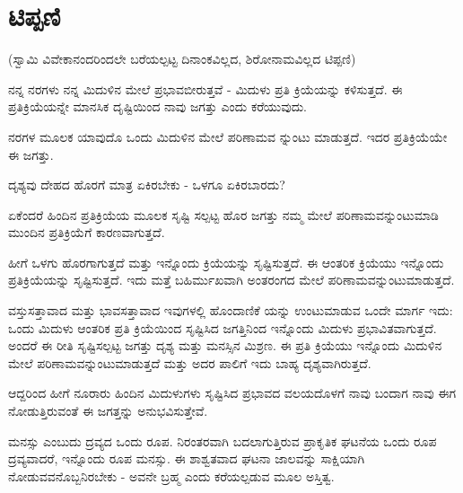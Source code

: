 
\chapter{ಟಿಪ್ಪಣಿ}

(ಸ್ವಾಮಿ ವಿವೇಕಾನಂದರಿಂದಲೇ ಬರೆಯಲ್ಪಟ್ಟ ದಿನಾಂಕವಿಲ್ಲದ, ಶಿರೋನಾಮವಿಲ್ಲದ ಟಿಪ್ಪಣಿ)

ನನ್ನ ನರಗಳು ನನ್ನ ಮಿದುಳಿನ ಮೇಲೆ ಪ್ರಭಾವಬೀರುತ್ತವೆ - ಮಿದುಳು ಪ್ರತಿ ಕ್ರಿಯೆಯನ್ನು ಕಳಿಸುತ್ತದೆ. ಈ ಪ್ರತಿಕ್ರಿಯೆಯನ್ನೇ ಮಾನಸಿಕ ದೃಷ್ಟಿಯಿಂದ ನಾವು ಜಗತ್ತು ಎಂದು ಕರೆಯುವುದು.

ನರಗಳ ಮೂಲಕ ಯಾವುದೊ ಒಂದು ಮಿದುಳಿನ ಮೇಲೆ ಪರಿಣಾಮವ ನ್ನುಂಟು ಮಾಡುತ್ತದೆ. ಇದರ ಪ್ರತಿಕ್ರಿಯೆಯೇ ಈ ಜಗತ್ತು.

ದೃಶ್ಯವು ದೇಹದ ಹೊರಗೆ ಮಾತ್ರ ಏಕಿರಬೇಕು - ಒಳಗೂ ಏಕಿರಬಾರದು?

ಏಕೆಂದರೆ ಹಿಂದಿನ ಪ್ರತಿಕ್ರಿಯೆಯ ಮೂಲಕ ಸೃಷ್ಟಿ ಸಲ್ಪಟ್ಟ ಹೊರ ಜಗತ್ತು ನಮ್ಮ ಮೇಲೆ ಪರಿಣಾಮವನ್ನುಂಟುಮಾಡಿ ಮುಂದಿನ ಪ್ರತಿಕ್ರಿಯೆಗೆ ಕಾರಣವಾಗುತ್ತದೆ.

ಹೀಗೆ ಒಳಗು ಹೊರಗಾಗುತ್ತದೆ ಮತ್ತು ಇನ್ನೊಂದು ಕ್ರಿಯೆಯನ್ನು ಸೃಷ್ಟಿಸುತ್ತದೆ. ಈ ಆಂತರಿಕ ಕ್ರಿಯೆಯು ಇನ್ನೊಂದು ಪ್ರತಿಕ್ರಿಯೆಯನ್ನು ಸೃಷ್ಟಿಸುತ್ತದೆ. ಇದು ಮತ್ತೆ ಬಹಿರ್ಮುಖವಾಗಿ ಅಂತರಂಗದ ಮೇಲೆ ಪರಿಣಾಮವನ್ನುಂಟುಮಾಡುತ್ತದೆ.

ವಸ್ತುಸತ್ತಾವಾದ ಮತ್ತು ಭಾವಸತ್ತಾವಾದ ಇವುಗಳಲ್ಲಿ ಹೊಂದಾಣಿಕೆ ಯನ್ನು ಉಂಟುಮಾಡುವ ಒಂದೇ ಮಾರ್ಗ ಇದು: ಒಂದು ಮಿದುಳು ಆಂತರಿಕ ಪ್ರತಿ ಕ್ರಿಯೆಯಿಂದ ಸೃಷ್ಟಿಸಿದ ಜಗತ್ತಿನಿಂದ ಇನ್ನೊಂದು ಮಿದುಳು ಪ್ರಭಾವಿತವಾಗುತ್ತದೆ. ಅಂದರೆ ಈ ರೀತಿ ಸೃಷ್ಟಿಸಲ್ಪಟ್ಟ ಜಗತ್ತು ದೃಶ್ಯ ಮತ್ತು ಮನಸ್ಸಿನ ಮಿಶ್ರಣ. ಈ ಪ್ರತಿ ಕ್ರಿಯೆಯು ಇನ್ನೊಂದು ಮಿದುಳಿನ ಮೇಲೆ ಪರಿಣಾಮವನ್ನುಂಟುಮಾಡುತ್ತದೆ ಮತ್ತು ಅದರ ಪಾಲಿಗೆ ಇದು ಬಾಹ್ಯ ದೃಶ್ಯವಾಗಿರುತ್ತದೆ.

ಆದ್ದರಿಂದ ಹೀಗೆ ನೂರಾರು ಹಿಂದಿನ ಮಿದುಳುಗಳು ಸೃಷ್ಟಿಸಿದ ಪ್ರಭಾವದ ವಲಯದೊಳಗೆ ನಾವು ಬಂದಾಗ ನಾವು ಈಗ ನೋಡುತ್ತಿರುವಂತೆ ಈ ಜಗತ್ತನ್ನು ಅನುಭವಿಸುತ್ತೇವೆ.

ಮನಸ್ಸು ಎಂಬುದು ದ್ರವ್ಯದ ಒಂದು ರೂಪ. ನಿರಂತರವಾಗಿ ಬದಲಾಗುತ್ತಿರುವ ಪ್ರಾಕೃತಿಕ ಘಟನೆಯ ಒಂದು ರೂಪ ದ್ರವ್ಯವಾದರೆ, ಇನ್ನೊಂದು ರೂಪ ಮನಸ್ಸು. ಈ ಶಾಶ್ವತವಾದ ಘಟನಾ ಜಾಲವನ್ನು ಸಾಕ್ಷಿಯಾಗಿ ನೋಡುವವನೊಬ್ಬನಿರಬೇಕು - ಅವನೇ ಬ್ರಹ್ಮ ಎಂದು ಕರೆಯಲ್ಪಡುವ ಮೂಲ ಅಸ್ತಿತ್ವ.

